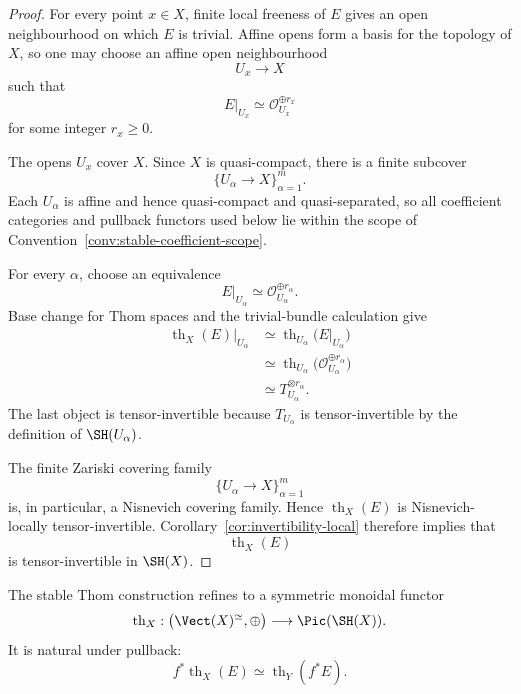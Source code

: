\begin{proof}
For every point \(x\in X\), finite local freeness of \(E\) gives an open
neighbourhood on which \(E\) is trivial.  Affine opens form a basis for the
topology of \(X\), so one may choose an affine open neighbourhood
\[
    U_x\longrightarrow X
\]
such that
\[
    E|_{U_x}
    \simeq
    \mathcal O_{U_x}^{\oplus r_x}
\]
for some integer \(r_x\geq0\).

The opens \(U_x\) cover \(X\).  Since \(X\) is quasi-compact, there is a
finite subcover
\[
    \{U_\alpha\longrightarrow X\}_{\alpha=1}^m.
\]
Each \(U_\alpha\) is affine and hence quasi-compact and quasi-separated, so
all coefficient categories and pullback functors used below lie within the
scope of Convention~\ref{conv:stable-coefficient-scope}.

For every \(\alpha\), choose an equivalence
\[
    E|_{U_\alpha}
    \simeq
    \mathcal O_{U_\alpha}^{\oplus r_\alpha}.
\]
Base change for Thom spaces and the trivial-bundle calculation give
\[
\begin{aligned}
    \operatorname{th}_X(E)|_{U_\alpha}
    &\simeq
    \operatorname{th}_{U_\alpha}
    \bigl(
      E|_{U_\alpha}
    \bigr) \\
    &\simeq
    \operatorname{th}_{U_\alpha}
    \bigl(
      \mathcal O_{U_\alpha}^{\oplus r_\alpha}
    \bigr) \\
    &\simeq
    T_{U_\alpha}^{\otimes r_\alpha}.
\end{aligned}
\]
The last object is tensor-invertible because
\(T_{U_\alpha}\) is tensor-invertible by the definition of
\(\SH(U_\alpha)\).

The finite Zariski covering family
\[
    \{U_\alpha\longrightarrow X\}_{\alpha=1}^m
\]
is, in particular, a Nisnevich covering family.  Hence
\(\operatorname{th}_X(E)\) is Nisnevich-locally tensor-invertible.
Corollary~\ref{cor:invertibility-local} therefore implies that
\[
    \operatorname{th}_X(E)
\]
is tensor-invertible in \(\SH(X)\).
\end{proof}

\begin{corollary}
\label{cor:stable-thom-functor}
The stable Thom construction refines to a symmetric monoidal functor
\[
    \operatorname{th}_X:
    \bigl(\Vect(X)^\simeq,\oplus\bigr)
    \longrightarrow
    \Pic(\SH(X)).
\]
It is natural under pullback:
\[
    f^*\operatorname{th}_X(E)
    \simeq
    \operatorname{th}_Y(f^*E).
\]
\end{corollary}

